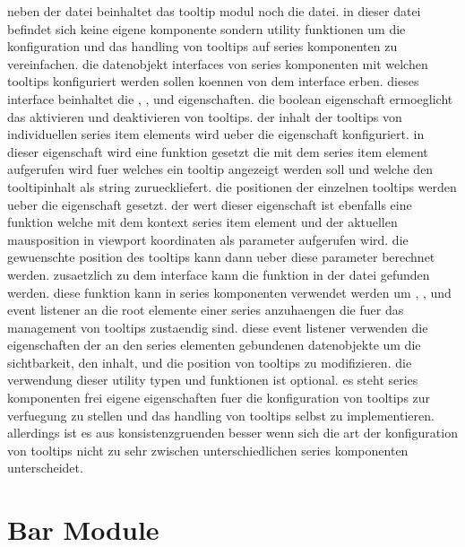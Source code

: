 neben der  datei beinhaltet das tooltip modul noch die  datei.
in dieser datei befindet sich keine eigene komponente sondern utility funktionen um die konfiguration und das handling von tooltips auf series komponenten zu vereinfachen.
die datenobjekt interfaces von series komponenten mit welchen tooltips konfiguriert werden sollen koennen von dem  interface erben.
dieses interface beinhaltet die , , und  eigenschaften.
die  boolean eigenschaft ermoeglicht das aktivieren und deaktivieren von tooltips.
der inhalt der tooltips von individuellen series item elements wird ueber die  eigenschaft konfiguriert.
in dieser eigenschaft wird eine funktion gesetzt die mit dem series item element aufgerufen wird fuer welches ein tooltip angezeigt werden soll und welche den tooltipinhalt als string zurueckliefert.     
die positionen der einzelnen tooltips werden ueber die  eigenschaft gesetzt.
der wert dieser eigenschaft ist ebenfalls eine funktion welche mit dem kontext series item element und der aktuellen mausposition in viewport koordinaten als parameter aufgerufen wird.
die gewuenschte position des tooltips kann dann ueber diese parameter berechnet werden.
%
zusaetzlich zu dem  interface kann die  funktion in der  datei gefunden werden.
diese funktion kann in series komponenten verwendet werden um , , und  event listener an die root elemente einer series anzuhaengen die fuer das management von tooltips zustaendig sind.
diese event listener verwenden die  eigenschaften der an den series elementen gebundenen datenobjekte um die sichtbarkeit, den inhalt, und die position von tooltips zu modifizieren.
die verwendung dieser utility typen und funktionen ist optional.
es steht series komponenten frei eigene eigenschaften fuer die konfiguration von tooltips zur verfuegung zu stellen und das handling von tooltips selbst zu implementieren.
allerdings ist es aus konsistenzgruenden besser wenn sich die art der konfiguration von tooltips nicht zu sehr zwischen unterschiedlichen series komponenten unterscheidet.   



\section{Bar Module}

